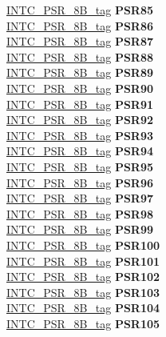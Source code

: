\begin{DoxyCompactItemize}
\begin{tabbing}
\>\>\mbox{\hyperlink{unionINTC__PSR__8B__tag}{INTC\_PSR\_8B\_tag}} {\bfseries PSR85}\\
\>\>\mbox{\hyperlink{unionINTC__PSR__8B__tag}{INTC\_PSR\_8B\_tag}} {\bfseries PSR86}\\
\>\>\mbox{\hyperlink{unionINTC__PSR__8B__tag}{INTC\_PSR\_8B\_tag}} {\bfseries PSR87}\\
\>\>\mbox{\hyperlink{unionINTC__PSR__8B__tag}{INTC\_PSR\_8B\_tag}} {\bfseries PSR88}\\
\>\>\mbox{\hyperlink{unionINTC__PSR__8B__tag}{INTC\_PSR\_8B\_tag}} {\bfseries PSR89}\\
\>\>\mbox{\hyperlink{unionINTC__PSR__8B__tag}{INTC\_PSR\_8B\_tag}} {\bfseries PSR90}\\
\>\>\mbox{\hyperlink{unionINTC__PSR__8B__tag}{INTC\_PSR\_8B\_tag}} {\bfseries PSR91}\\
\>\>\mbox{\hyperlink{unionINTC__PSR__8B__tag}{INTC\_PSR\_8B\_tag}} {\bfseries PSR92}\\
\>\>\mbox{\hyperlink{unionINTC__PSR__8B__tag}{INTC\_PSR\_8B\_tag}} {\bfseries PSR93}\\
\>\>\mbox{\hyperlink{unionINTC__PSR__8B__tag}{INTC\_PSR\_8B\_tag}} {\bfseries PSR94}\\
\>\>\mbox{\hyperlink{unionINTC__PSR__8B__tag}{INTC\_PSR\_8B\_tag}} {\bfseries PSR95}\\
\>\>\mbox{\hyperlink{unionINTC__PSR__8B__tag}{INTC\_PSR\_8B\_tag}} {\bfseries PSR96}\\
\>\>\mbox{\hyperlink{unionINTC__PSR__8B__tag}{INTC\_PSR\_8B\_tag}} {\bfseries PSR97}\\
\>\>\mbox{\hyperlink{unionINTC__PSR__8B__tag}{INTC\_PSR\_8B\_tag}} {\bfseries PSR98}\\
\>\>\mbox{\hyperlink{unionINTC__PSR__8B__tag}{INTC\_PSR\_8B\_tag}} {\bfseries PSR99}\\
\>\>\mbox{\hyperlink{unionINTC__PSR__8B__tag}{INTC\_PSR\_8B\_tag}} {\bfseries PSR100}\\
\>\>\mbox{\hyperlink{unionINTC__PSR__8B__tag}{INTC\_PSR\_8B\_tag}} {\bfseries PSR101}\\
\>\>\mbox{\hyperlink{unionINTC__PSR__8B__tag}{INTC\_PSR\_8B\_tag}} {\bfseries PSR102}\\
\>\>\mbox{\hyperlink{unionINTC__PSR__8B__tag}{INTC\_PSR\_8B\_tag}} {\bfseries PSR103}\\
\>\>\mbox{\hyperlink{unionINTC__PSR__8B__tag}{INTC\_PSR\_8B\_tag}} {\bfseries PSR104}\\
\>\>\mbox{\hyperlink{unionINTC__PSR__8B__tag}{INTC\_PSR\_8B\_tag}} {\bfseries PSR105}\\

\end{tabbing}
\end{DoxyCompactItemize}
